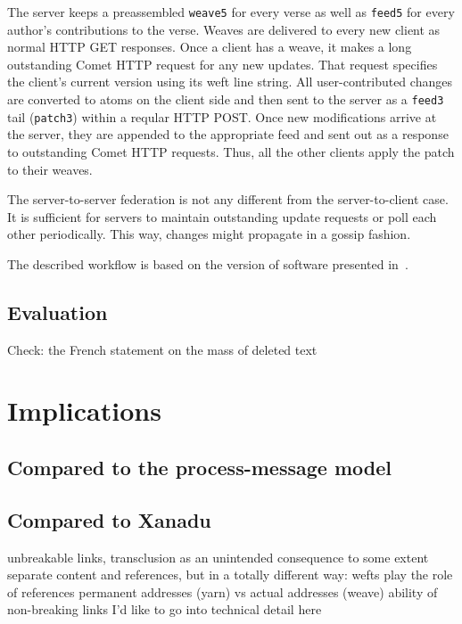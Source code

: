 \documentclass{acm_proc_article-sp}
\begin{document}
The server keeps a preassembled {\tt weave5} for every verse as well as {\tt feed5} for every author's contributions to the verse. Weaves are delivered to every new client as normal HTTP GET responses. Once a client has a weave, it makes a long outstanding Comet HTTP request for any new updates. That request specifies the client's current version using its weft line string. All user-contributed changes are converted to atoms on the client side and then sent to the server as a {\tt feed3} tail ({\tt patch3}) within a reqular HTTP POST. Once new modifications arrive at the server, they are appended to the appropriate feed and sent out as a response to outstanding Comet HTTP requests. Thus, all the other clients apply the patch to their weaves.

The server-to-server federation is not any different from the server-to-client case. It is sufficient for servers to maintain outstanding update requests or poll each other periodically. This way, changes might propagate in a gossip fashion.

The described workflow is based on the version of software presented in~\cite{broth-csr}.

\subsection{Evaluation}

Check: the French statement on the mass of deleted text

\section{Implications}  \label{sec:conc}

\subsection{Compared to the process-message model}

\subsection{Compared to Xanadu}

unbreakable links, transclusion  as an unintended consequence
to some extent separate content and references, but in a totally different way:
wefts play the role of references
permanent addresses (yarn) vs actual addresses (weave)
ability of non-breaking links  I'd like to go into technical detail here
\end{document}
